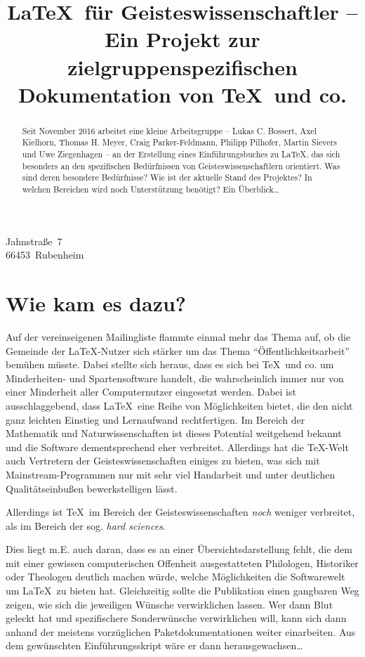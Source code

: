 \documentclass[ngerman]{dtk}
\begin{document}
	
	
\title{\LaTeX\ für Geisteswissenschaftler -- 
    Ein Projekt zur zielgruppenspezifischen Dokumentation von \TeX\ und co.}
%
	{Jahnstraße~7\\
	66453~Rubenheim\\
	}
\maketitle


\begin{abstract}
Seit November 2016 arbeitet eine kleine Arbeitsgruppe 
-- Lukas C. Bossert, 
Axel Kielhorn, 
Thomas H. Meyer, 
Craig Parker-Feldmann, 
Philipp Pilhofer, 
Martin Sievers 
und Uwe Ziegenhagen --
an der Erstellung eines Einführungsbuches zu \LaTeX ,
das sich besonders an den spezifischen Bedürfnissen von Geisteswissenschaftlern orientiert.
Was sind deren besondere Bedürfnisse?
Wie ist der aktuelle Stand des Projektes?
In welchen Bereichen wird noch Unterstützung benötigt?
Ein Überblick\ldots 
\end{abstract}

\section{Wie kam es dazu?}

Auf der vereinseigenen Mailingliste flammte einmal mehr das Thema auf, ob die Gemeinde der \LaTeX -Nutzer
sich stärker um das Thema \enquote{Öffentlichkeitsarbeit} bemühen müsste.
Dabei stellte sich heraus, dass es sich bei \TeX\ und co. um Minderheiten- und Spartensoftware handelt, die
wahrscheinlich immer nur von einer Minderheit aller Computernutzer eingesetzt werden.
Dabei ist ausschlaggebend, dass \LaTeX\ eine Reihe von Möglichkeiten bietet, die den nicht ganz leichten Einstieg
und Lernaufwand rechtfertigen. 
Im Bereich der Mathematik und Naturwissenschaften ist dieses Potential weitgehend bekannt und die Software
dementsprechend eher verbreitet.
Allerdings hat die \TeX -Welt auch Vertretern der Geisteswissenschaften einiges zu bieten, was sich mit 
Mainstream-Programmen nur mit sehr viel Handarbeit und unter deutlichen Qualitätseinbußen bewerkstelligen lässt.

Allerdings ist \TeX\ im Bereich der Geisteswissenschaften \emph{noch} weniger verbreitet, als im Bereich der
sog. \emph{hard sciences}.

Dies liegt m.E. auch daran, dass es an einer Übersichtsdarstellung fehlt, die dem mit einer gewissen 
computerischen Offenheit ausgestatteten Philologen, Historiker oder Theologen deutlich machen würde,
welche Möglichkeiten die Softwarewelt um \LaTeX\ zu bieten hat. 
Gleichzeitig sollte die Publikation einen gangbaren Weg zeigen, wie sich die jeweiligen Wünsche verwirklichen
lassen. Wer dann Blut geleckt hat und spezifischere Sonderwünsche verwirklichen will, kann sich dann anhand
der meistens vorzüglichen Paketdokumentationen weiter einarbeiten. 
Aus dem gewünschten Einführungsskript wäre er dann herausgewachsen\ldots 
\end{document}
